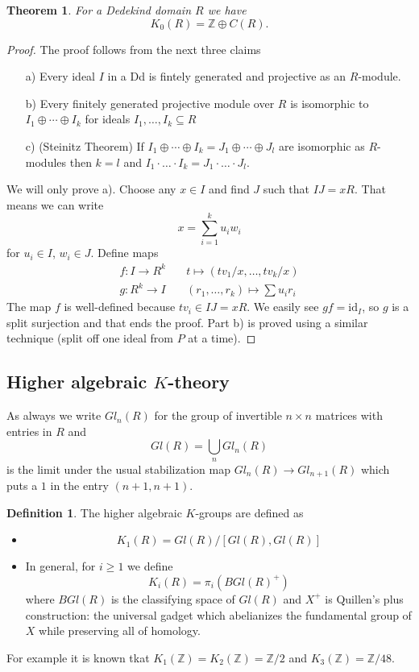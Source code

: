 \documentclass[a4paper,10pt]{article}
\theoremstyle{plain}%
\newtheorem{thm}{Theorem}
\theoremstyle{definition}
\newtheorem{defn}{Definition}
\theoremstyle{remark}
\newcommand{\ZZ}{\mathbb{Z}}
\begin{document}
\begin{thm}
For a Dedekind domain $R$ we have
$$K_0(R)=\ZZ\oplus C(R).$$
\end{thm}
\begin{proof}
The proof follows from the next three claims
\begin{itemize}
\item[a)] Every ideal $I$ in a Dd is fintely generated and projective as an $R$-module.
\item[b)] Every finitely generated projective module over $R$ is isomorphic to $I_1\oplus\cdots\oplus I_k$ for ideals $I_1,\ldots,I_k\subseteq R$
\item[c)] (Steinitz Theorem) If $I_1\oplus\cdots\oplus I_k=J_1\oplus\cdots\oplus J_l$ are isomorphic as $R$-modules then $k=l$ and $I_1\cdot\ldots\cdot I_k=J_1\cdot\ldots\cdot J_l$.
\end{itemize}
We will only prove a). Choose any $x\in I$ and find $J$ such that $IJ=xR$. That means we can write 
$$x=\sum_{i=1}^k u_iw_i$$
for $u_i\in I$, $w_i\in J$.
Define maps
\begin{align*}
f:I\to R^k &\quad t\mapsto (tv_1/x,\ldots,tv_k/x)\\
g:R^k\to I &\quad (r_1,\ldots,r_k)\mapsto \sum u_ir_i
\end{align*}
The map $f$ is well-defined because $tv_i\in IJ=xR$. We easily see $gf=\textrm{id}_I$, so $g$ is a split surjection and that ends the proof.
Part b) is proved using a similar technique (split off one ideal from $P$ at a time).
\end{proof}

\subsection{Higher algebraic $K$-theory}
As always we write $Gl_n(R)$ for the group of invertible $n\times n$ matrices with entries in $R$ and 
$$Gl(R)=\bigcup_{n} Gl_n(R)$$
is the limit under the usual stabilization map $Gl_n(R)\to Gl_{n+1}(R)$ which puts a $1$ in the entry $(n+1,n+1)$.

\begin{defn}
The higher algebraic $K$-groups are defined as
\begin{itemize}
\item $$K_1(R)=Gl(R)\big/[Gl(R),Gl(R)]$$
\item In general, for $i\geq 1$ we define
$$K_i(R)=\pi_i(BGl(R)^+)$$
where $BGl(R)$ is the classifying space of $Gl(R)$ and $X^+$ is Quillen's plus construction: the universal gadget which abelianizes the fundamental group of $X$ while preserving all of homology.
\end{itemize}
\end{defn}

For example it is known tkat $K_1(\ZZ)=K_2(\ZZ)=\ZZ/2$ and $K_3(\ZZ)=\ZZ/48$. 
\end{document}
